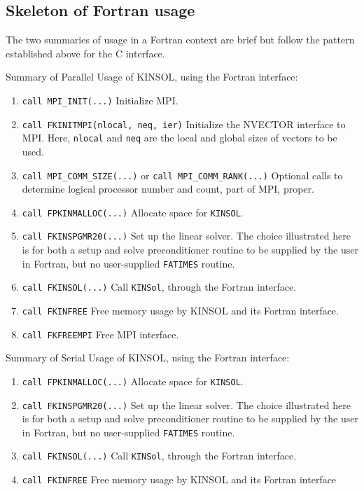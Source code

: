 \documentclass[11pt]{article}
\begin{document}
\subsection{Skeleton of Fortran usage}

The two summaries of usage in a Fortran context are brief but follow the
pattern established above for the C interface. 

{Summary of Parallel Usage of KINSOL, using the Fortran interface:} \label{Fparallel}

\begin{enumerate}

\item  {\tt call MPI\_INIT(...)}        Initialize MPI.
\item {\tt call FKINITMPI(nlocal, neq, ier)} Initialize the NVECTOR interface to MPI.
      Here, {\tt nlocal} and {\tt neq} are the local and global sizes of vectors to be used.

\item  {\tt call MPI\_COMM\_SIZE(...)} or {\tt call MPI\_COMM\_RANK(...)} Optional calls to 
    determine logical processor number and count, part of MPI, proper.

\item  {\tt call FPKINMALLOC(...)} Allocate space for {\tt KINSOL}.

\item  {\tt call FKINSPGMR20(...)} Set up the linear solver. The
    choice illustrated here is for both a setup and solve preconditioner 
    routine to be supplied by the user in Fortran, but no user-supplied
    {\tt FATIMES} routine.

\item  {\tt call FKINSOL(...)} Call {\tt KINSol}, through the Fortran interface.

\item  {\tt call FKINFREE}     Free memory usage by KINSOL and its Fortran interface.

\item  {\tt call FKFREEMPI} Free MPI interface.
\end{enumerate}

{Summary of Serial Usage of KINSOL, using the Fortran interface}: \label{Fserial}

\begin{enumerate}

\item  {\tt call FPKINMALLOC(...)} Allocate space for {\tt KINSOL}.

\item  {\tt call FKINSPGMR20(...)} Set up the linear solver. The
    choice illustrated here is for both a setup and solve preconditioner 
    routine to be supplied by the user in Fortran, but no user-supplied
    {\tt FATIMES} routine.

\item  {\tt call FKINSOL(...)} Call {\tt KINSol}, through the Fortran interface.

\item  {\tt call FKINFREE}     Free memory usage by KINSOL and its Fortran 
          interface
\end{enumerate}
\end{document}
